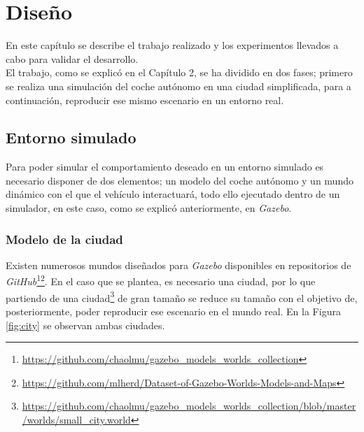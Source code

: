 \chapter{Diseño}
\label{cap:capitulo4}

En este capítulo se describe el trabajo realizado y los experimentos llevados a cabo para validar el desarrollo.\\

El trabajo, como se explicó en el Capítulo 2, se ha dividido en dos fases; primero se realiza una simulación del coche autónomo en una ciudad simplificada, para a continuación,
reproducir ese mismo escenario en un entorno real.\\

\section{Entorno simulado}
\label{section:simulation}
Para poder simular el comportamiento deseado en un entorno simulado es necesario disponer de dos elementos; un modelo del coche autónomo y un mundo dinámico con el que el vehículo
interactuará, todo ello ejecutado dentro de un simulador, en este caso, como se explicó anteriormente, en \textit{Gazebo}.\\

\subsection{Modelo de la ciudad}
\label{subsection:citymodel}
Existen numerosos mundos diseñados para \textit{Gazebo} disponibles en repositorios de
\textit{GitHub}\footnote{\url{https://github.com/chaolmu/gazebo_models_worlds_collection}}\footnote{\url{https://github.com/mlherd/Dataset-of-Gazebo-Worlds-Models-and-Maps}}. En
el caso que se plantea, es necesario una ciudad, por lo que partiendo de una
ciudad\footnote{\url{https://github.com/chaolmu/gazebo_models_worlds_collection/blob/master/worlds/small_city.world}} de gran tamaño se reduce su tamaño con el objetivo de,
posteriormente, poder reproducir ese escenario en el mundo real. En la Figura \ref{fig:city} se observan ambas ciudades.\\

